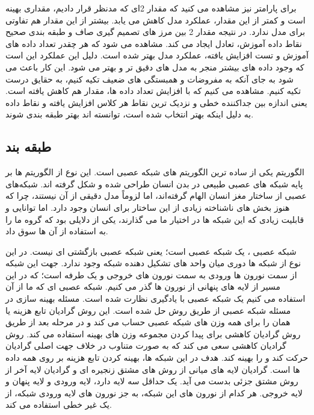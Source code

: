 \documentclass[12pt,onecolumn,a4paper]{article}
\begin{document}
برای پارامتر  نیز مشاهده می کنید که مقدار 2ای که مدنظر قرار دادیم، مقداری بهینه است و کمتر از این مقدار، عملکرد مدل کاهش می یابد. بیشتر از این مقدار هم تفاوتی برای مدل ندارد. در نتیجه مقدار 2 بین مرز های تصمیم گیری صاف و طبقه بندی صحیح نقاط داده آموزش، تعادل ایجاد می کند. مشاهده می شود که هر چقدر تعداد داده های آموزش و تست افزایش یافته، عملکرد مدل بهتر شده است. دلیل این عملکرد این است که وجود داده های بیشتر منجر به مدل های دقیق تر و بهتر می شود. این کار باعث می شود به جای آنکه به مفروضات و همبستگی های ضعیف تکیه کنیم، به حقایق درست تکیه کنیم. مشاهده می کنیم که با افزایش تعداد داده ها، مقدار  هم کاهش یافته است. یعنی اندازه  بین جداکننده خطی و نزدیک ترین نقاط هر کلاس افزایش یافته و نقاط داده به دلیل اینکه  بهتر انتخاب شده است، توانسته اند بهتر طبقه بندی شوند.


\subsection{طبقه بند }
الگوریتم  یکی از ساده ترین الگوریتم های شبکه عصبی است. این نوع از الگوریتم ها بر پایه شبکه های عصبی طبیعی در بدن انسان طراحی شده و شکل گرفته اند.
شبکه‌های عصبی از ساختار مغز انسان الهام گرفته‌اند، اما لزوماً مدل دقیقی از آن نیستند، چرا که هنوز بخش های ناشناخته زیادی از این ساختار برای انسان وجود دارد. اما توانایی و قابلیت زیادی که این شبکه ها در اختیار ما می گذارند، یکی از دلایلی بود که گروه ما را به استفاده از آن ها سوق داد. 

شبکه عصبی ، یک شبکه عصبی  است؛ یعنی شبکه عصبی بازگشتی ای نیست. در این نوع از شبکه ها دوری میان واحد های تشکیل دهنده شبکه وجود ندارد. جهت این شبکه از سمت نورون ها ورودی به سمت نورون های خروجی و یک طرفه است؛ که در این مسیر از لایه های پنهانی از نورون ها گذر می کنیم. شبکه عصبی ای که ما از آن استفاده می کنیم یک شبکه عصبی با یادگیری نظارت شده است. مسئله بهینه سازی  در مسئله شبکه عصبی از طریق روش  حل شده است. این روش گرادیان تابع هزینه یا همان  را برای همه وزن های شبکه عصبی حساب می کند و در مرحله بعد از طریق روش گرادیان کاهشی برای پیدا کردن مجموعه وزن های بهینه استفاده می کند. روش گرادیان کاهشی سعی می کند که به صورت متناوب در خلاف جهت اصلی گرادیان حرکت کند و  را بهینه کند. هدف در این شبکه ها، بهینه کردن تابع هزینه بر روی همه داده ها است.  گرادیان لایه های میانی از روش های مشتق زنجیره ای و گرادیان لایه آخر از روش مشتق جزئی بدست می آید. یک  حداقل سه لایه دارد، لایه ورودی و لایه پنهان و لایه خروجی. هر کدام از نورون های این شبکه، به جز نورون های لایه ورودی شبکه، از یک  غیر خطی استفاده می کند.
\end{document}
